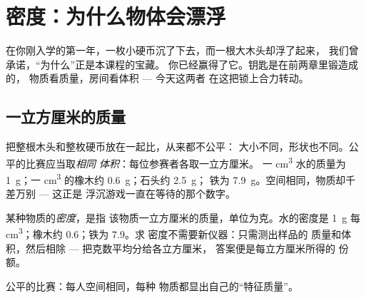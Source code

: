 \chapter{密度：为什么物体会漂浮}\label{ch:g6:density-floating}

在你刚入学的第一年，一枚小硬币沉了下去，而一根大木头却浮了起来，
我们曾承诺，“为什么”正是本课程的宝藏。
你已经赢得了它。钥匙是在前两章里锻造成的，
物质看质量，房间看体积 --- 今天这两者
在这把锁上合力转动。

\section{一立方厘米的质量}

\begin{example}[终于可以公平比较]\label{ex:g6:density-floating:fair}
把整根木头和整枚硬币放在一起比，从来都不公平：
大小不同，形状也不同。公平的比赛应当取\emph{相同
体积}：每位参赛者各取一立方厘米。
一 \unit{cm^3} 水的质量为 \qty{1}{g}；一 \unit{cm^3}
的橡木约 \qty{0.6}{g}；石头约 \qty{2.5}{g}；
铁为 \qty{7.9}{g}。空间相同，物质却千差万别 --- 这正是
浮沉游戏一直在等待的那个数字。
\end{example}

\begin{definition}[密度]\label{def:g6:density-floating:density}
某种物质的\emph{密度}，是指
该物质一立方厘米的质量，单位为克。水的密度是
\qty{1}{g} 每 \unit{cm^3}；橡木约 $0.6$；铁为 $7.9$。求
密度不需要新仪器：只需测出样品的
质量和体积，然后相除 --- 把克数平均分给各立方厘米，
答案便是每立方厘米所得的
份额。
\end{definition}

\begin{omfigure}

{\small 公平的比赛：每人空间相同，每种
物质都显出自己的“特征质量”。}
\end{omfigure}

